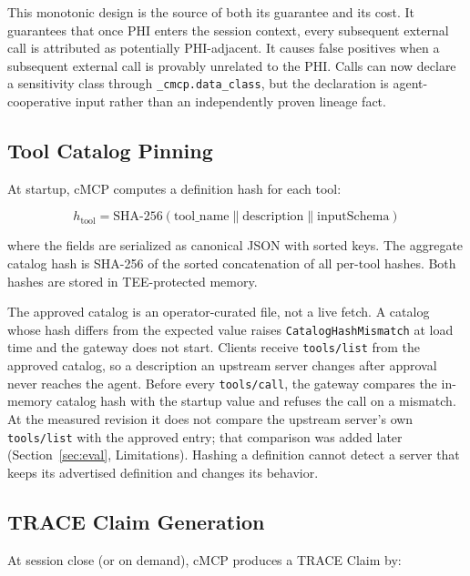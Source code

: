 This monotonic design is the source of both its guarantee and its cost. It guarantees that
once PHI enters the session context, every subsequent external call is attributed as
potentially PHI-adjacent. It causes false positives when a subsequent external call is
provably unrelated to the PHI. Calls can now declare a sensitivity class through
\texttt{\_cmcp.data\_class}, but the declaration is agent-cooperative input rather than an
independently proven lineage fact.

\subsection{Tool Catalog Pinning}

At startup, cMCP computes a definition hash for each tool:

\[
  h_{\text{tool}} = \text{SHA-256}(\text{tool\_name} \| \text{description} \| \text{inputSchema})
\]

where the fields are serialized as canonical JSON with sorted keys. The aggregate catalog
hash is SHA-256 of the sorted concatenation of all per-tool hashes. Both hashes are stored
in TEE-protected memory.

The approved catalog is an operator-curated file, not a live fetch. A catalog whose hash
differs from the expected value raises \texttt{CatalogHashMismatch} at load time and the
gateway does not start. Clients receive \texttt{tools/list} from the approved catalog, so a
description an upstream server changes after approval never reaches the agent. Before every
\texttt{tools/call}, the gateway compares the in-memory catalog hash with the startup value
and refuses the call on a mismatch. At the measured revision it does not compare the
upstream server's own \texttt{tools/list} with the approved entry; that comparison was added
later (Section~\ref{sec:eval}, Limitations). Hashing a definition cannot detect a server
that keeps its advertised definition and changes its behavior.

\subsection{TRACE Claim Generation}

At session close (or on demand), cMCP produces a TRACE Claim by:

